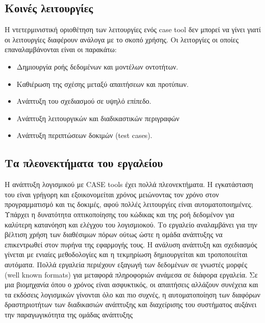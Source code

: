 \subsection{Kοινές λειτουργίες}
Η ντετερμινιστική οριοθέτηση των λειτουργίες ενός case tool δεν μπορεί να γίνει γιατί οι λειτουργίες διαφέρουν ανάλογα με το σκοπό χρήσης. Οι λειτοργίες οι οποίες επαναλαμβάνονται είναι οι παρακάτω:
\begin{itemize}
	\item Δημιουργία ροής δεδομένων και μοντέλων οντοτήτων.
	\item Καθιέρωση της σχέσης μεταξύ απαιτήσεων και προτύπων.
	\item Ανάπτυξη του σχεδιασμού σε υψηλό επίπεδο.
	\item Ανάπτυξη λειτουργικών και διαδικαστικών περιγραφών
	\item Ανάπτυξη περιπτώσεων δοκιμών (test cases).	
\end{itemize}

\subsection{Τα πλεονεκτήματα του εργαλείου}
H ανάπτυξη λογισμικού με CASE tools έχει πολλά πλεονεκτήματα. Η εγκατάσταση του είναι γρήγορη και εξοικονομείται χρόνος μειώνοντας τον χρόνο στον προγραμματισμό και τις δοκιμές, αφού πολλές λειτουργίες είναι αυτοματοποιημένες. Υπάρχει η δυνατότητα οπτικοποίησης του κώδικας και της ροή δεδομένον για καλύτερη κατανόηση και ελέγχου του λογισμιοκού. Το εργαλείο αναλαμβάνει για την βέλτιση χρήση των διαθέσιμων πόρων ούτως ώστε η ομάδα ανάπτυξης να επικεντρωθεί στον πυρήνα της εφαρμογής τους. Η ανάλυση ανάπτυξη και σχεδιασμός γίνεται με ενιαίες μεθοδολογίες και η τεκμηρίωση δημιουργείται και τροποποιείται αυτόματα. Πολλά εργαλεία περιέχουν εξαγωγή των δεδομένων σε γνωστές μορφές (well known formats) για μεταφορά πληροφοριών ανάμεσα σε διάφορα εργαλεία. Σε μια βιομηχανία όπου ο χρόνος είναι ασφυκτικός, οι απαιτήσεις αλλάζουν συνέχεια και τα εκδόσεις λογισμικών γίνονται όλο και πιο συχνές, η αυτοματοποίηση των διαφόρων δραστηριοτήτων των διαδικασιών ανάπτυξης και διαχείρισης του συστήματος αυξάνει την παραγωγικότητα της ομάδας ανάπτυξης 

